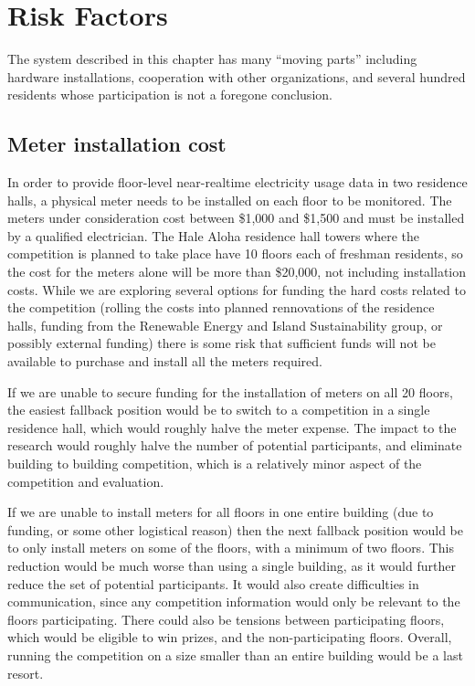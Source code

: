 \section{Risk Factors}

The system described in this chapter has many ``moving parts'' including hardware installations, cooperation with other organizations, and several hundred residents whose participation is not a foregone conclusion.

\subsection{Meter installation cost}

In order to provide floor-level near-realtime electricity usage data in two residence halls, a physical meter needs to be installed on each floor to be monitored. The meters under consideration cost between \$1,000 and \$1,500 and must be installed by a qualified electrician. The Hale Aloha residence hall towers where the competition is planned to take place have 10 floors each of freshman residents, so the cost for the meters alone will be more than \$20,000, not including installation costs. While we are exploring several options for funding the hard costs related to the competition (rolling the costs into planned rennovations of the residence halls, funding from the Renewable Energy and Island Sustainability group, or possibly external funding) there is some risk that sufficient funds will not be available to purchase and install all the meters required.

If we are unable to secure funding for the installation of meters on all 20 floors, the easiest fallback position would be to switch to a competition in a single residence hall, which would roughly halve the meter expense. The impact to the research would roughly halve the number of potential participants, and eliminate building to building competition, which is a relatively minor aspect of the competition and evaluation.

If we are unable to install meters for all floors in one entire building (due to funding, or some other logistical reason) then the next fallback position would be to only install meters on some of the floors, with a minimum of two floors. This reduction would be much worse than using a single building, as it would further reduce the set of potential participants. It would also create difficulties in communication, since any competition information would only be relevant to the floors participating. There could also be tensions between participating floors, which would be eligible to win prizes, and the non-participating floors. Overall, running the competition on a size smaller than an entire building would be a last resort.

